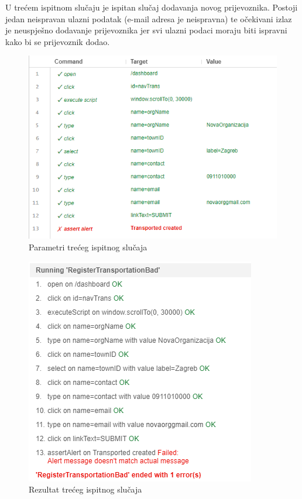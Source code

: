 			\eject
			U trećem ispitnom slučaju je ispitan slučaj dodavanja novog prijevoznika. Postoji jedan neispravan ulazni podatak (e-mail adresa je neispravna) te očekivani izlaz je neuspješno dodavanje prijevoznika jer svi ulazni podaci moraju biti ispravni kako bi se prijevoznik dodao.
			\begin{figure}[H]
				\centering
				\includegraphics[width=\textwidth]{"slike/Selenium/transport testovi/registerTransportationBad_parameters.png"}
				\caption{Parametri trećeg ispitnog slučaja}
				\label{fig: registerTransportationBad_parameters}
			\end{figure}
			\begin{figure}[H]
				\centering
				\includegraphics[width=\textwidth]{"slike/Selenium/transport testovi/registerTransportationBad_results.png"}
				\caption{Rezultat trećeg ispitnog slučaja}
				\label{fig: registerTransportationBad_result}
			\end{figure}
